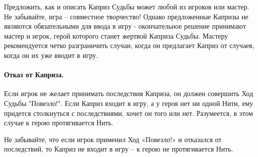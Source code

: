 \begin{tcolorbox}
Предложить, как и описать Каприз Судьбы может любой из игроков или мастер. Не забывайте, игра – совместное творчество! Однако предложенные Капризы не являются обязательными для ввода в игру - окончательное решение принимают мастер и игрок, герой которого станет жертвой Каприза Судьбы.
\newline Мастеру рекомендуется четко разграничить случаи, когда он предлагает Каприз от случаев, когда он их уже вводит в игру.
\end{tcolorbox}
\paragraph{Отказ от Каприза.} Если игрок не желает принимать последствия Каприза, он должен совершить Ход Судьбы "Повезло!". Если Каприз входит в игру, а у героя нет ни одной Нити, ему придется столкнуться с последствиями, хочет он того или нет. Разумеется, в этом случае к герою протягивается Нить.
\begin{tcolorbox}
Не забывайте, что если игрок применил Ход «Повезло!» и отказался от последствий, то Каприз не входит в игру – к герою не протягивается Нить.
\end{tcolorbox}

